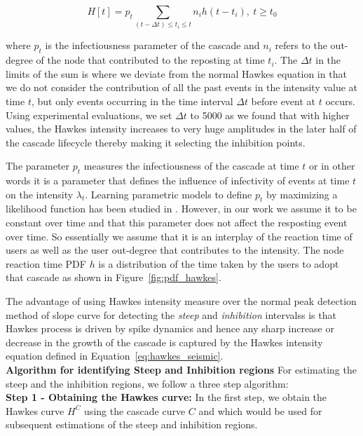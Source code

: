\documentclass[smallextended]{svjour3}       %
\theoremstyle{definition}
\begin{document}
\begin{equation}
H[t] = p_t \sum \limits_{(t-\Delta t) \leq t_i \leq t} n_i h(t-t_i), \ t \geq t_0
\label{eq:hawkes_seismic}
\end{equation}

where $p_t$ is the infectiousness parameter of the cascade and $n_i$ refers to the out-degree of the node that contributed to the reposting at time $t_i $. The $\Delta t $ in the limits of the sum is where we deviate from the normal Hawkes equation in that we do not consider the contribution of all the past events in the intensity value at time $t $, but only events occurring in the time interval $\Delta t$ before event at $t $ occurs. Using experimental evaluations, we set $\Delta t $ to 5000 as we found that with higher values, the Hawkes intensity increases to very huge amplitudes in the later half of the cascade lifecycle thereby making it selecting the inhibition points.


The parameter $p_t $ measures the infectiousness of the cascade at time $t $ or in other words it is a parameter that defines the influence of infectivity of events at time $t $ on the intensity $\lambda_t $. Learning parametric models to define $p_t $ by maximizing a likelihood function has been studied in \cite{hawkes_zha}. However, in our work we assume it to be constant over time and that this parameter does not affect the resposting event over time. So essentially we assume that it is an interplay of the reaction time of users as well as the user out-degree that contributes to the intensity. The node reaction time PDF $h $ is a distribution of the time taken by the users to adopt that cascade as shown in Figure~\ref{fig:pdf_hawkes}.

The advantage of using Hawkes intensity measure over the normal peak detection method of slope curve for detecting the \textit{steep} and \textit{inhibition} intervalss is that Hawkes process is driven by spike dynamics and hence any sharp increase or decrease in the growth of the cascade is captured by the Hawkes intensity equation defined in Equation~\ref{eq:hawkes_seismic}.
\\

\noindent \textbf{Algorithm for identifying Steep and Inhibition regions}
For estimating the steep and the inhibition regions, we follow a three step algorithm: \\

\textbf{Step 1 - Obtaining the Hawkes curve:} In the first step, we obtain the Hawkes curve $H^C $ using the cascade curve $C $ and which would be used for subsequent estimations of the steep and inhibition regions. 
\end{document}
